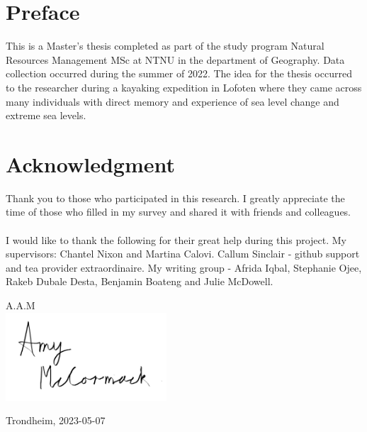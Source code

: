 \section{Preface}
This is a Master's thesis completed as part of the study program Natural Resources Management MSc at NTNU in the department of Geography. Data collection occurred during the summer of 2022. The idea for the thesis occurred to the researcher during a kayaking expedition in Lofoten where they came across many individuals with direct memory and experience of sea level change and extreme sea levels. \\[2cm]

\section{Acknowledgment}
Thank you to those who participated in this research. I greatly appreciate the time of those who filled in my survey and shared it with friends and colleagues.
\paragraph{}

I would like to thank the following for their great help during this project. My supervisors: Chantel Nixon and Martina Calovi. Callum Sinclair - github support and tea provider extraordinaire. My writing group - Afrida Iqbal, Stephanie Ojee, Rakeb Dubale Desta, Benjamin Boateng and Julie McDowell.  



\begin{flushright}
A.A.M\\[1pc]

\includegraphics[width=6cm]{fig/to use signature png.png}

Trondheim, 2023-05-07\\[1pc]
\end{flushright}
